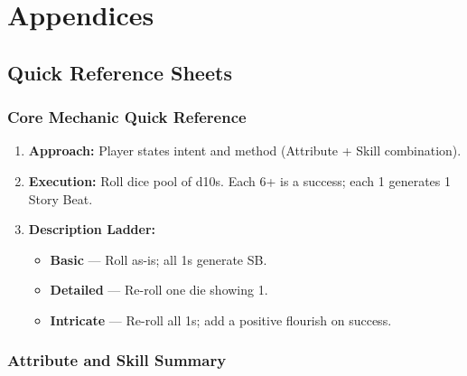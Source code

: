 
\chapter{Appendices}\label{chap:appendices}

\renewcommand{\arraystretch}{1.15}
\newcommand{\feTableStart}{\rowcolors{2}{FeRow}{white}\small}
\newcommand{\feTableEnd}{\rowcolors{2}{}{}}

\appendix

\section{Quick Reference Sheets}\label{sec:quick_reference}

\subsection{Core Mechanic Quick Reference}\label{subsec:core_mechanic_ref}

\begin{enumerate}
    \item \textbf{Approach:} Player states intent and method (Attribute + Skill combination).
    \item \textbf{Execution:} Roll dice pool of d10s. Each 6+ is a success; each 1 generates 1 Story Beat.
    \item \textbf{Description Ladder:}
        \begin{itemize}
            \item \textbf{Basic} --- Roll as-is; all 1s generate SB.
            \item \textbf{Detailed} --- Re-roll one die showing 1.
            \item \textbf{Intricate} --- Re-roll all 1s; add a positive flourish on success.
        \end{itemize}
\end{enumerate}

\subsection{Attribute and Skill Summary}\label{subsec:attributes_skills_ref}


